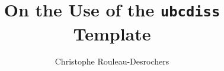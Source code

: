 \documentclass[gpscopy,onehalfspacing,11pt]{ubcdiss}
\title{On the Use of the \texttt{ubcdiss} Template}
\author{Christophe Rouleau-Desrochers}
\begin{document}

\maketitle

\makecommitteepage


\cleardoublepage


\cleardoublepage


\cleardoublepage

\tableofcontents
\cleardoublepage	%

\listoftables
\cleardoublepage	%

\listoffigures
\cleardoublepage	%



\textspacing		%




\mainmatter

\acresetall	%




%
%
%
%
%
\end{document}
